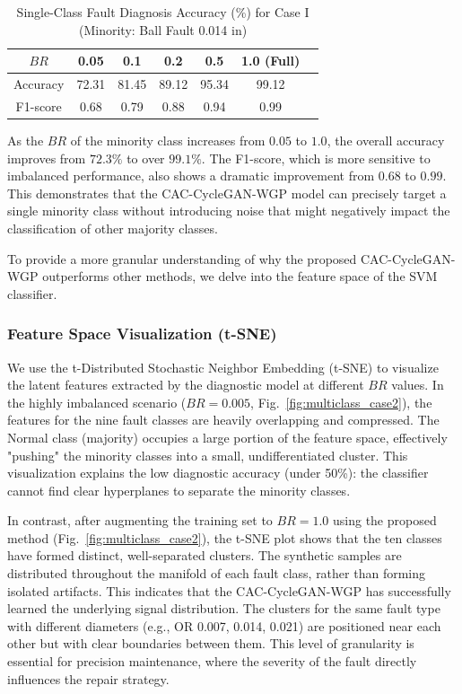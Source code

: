 \begin{table}[htbp]
\centering
\caption{Single-Class Fault Diagnosis Accuracy (\%) for Case I (Minority: Ball Fault 0.014 in)}
\label{tab:single_case1}
\begin{tabular}{ccccccc}
\hline
$BR$ & 0.05 & 0.1 & 0.2 & 0.5 & 1.0 (Full) \\ \hline
Accuracy & 72.31 & 81.45 & 89.12 & 95.34 & 99.12 \\
F1-score & 0.68  & 0.79  & 0.88  & 0.94  & 0.99 \\
\hline
\end{tabular}
\end{table}

As the $BR$ of the minority class increases from $0.05$ to $1.0$, the overall accuracy improves from $72.3\%$ to over $99.1\%$. The F1-score, which is more sensitive to imbalanced performance, also shows a dramatic improvement from $0.68$ to $0.99$. This demonstrates that the CAC-CycleGAN-WGP model can precisely target a single minority class without introducing noise that might negatively impact the classification of other majority classes.

To provide a more granular understanding of why the proposed CAC-CycleGAN-WGP outperforms other methods, we delve into the feature space of the SVM classifier.

\subsubsection{Feature Space Visualization (t-SNE)}
We use the t-Distributed Stochastic Neighbor Embedding (t-SNE) to visualize the latent features extracted by the diagnostic model at different $BR$ values. In the highly imbalanced scenario ($BR=0.005$, Fig.~\ref{fig:multiclass_case2}), the features for the nine fault classes are heavily overlapping and compressed. The Normal class (majority) occupies a large portion of the feature space, effectively "pushing" the minority classes into a small, undifferentiated cluster. This visualization explains the low diagnostic accuracy (under 50\%): the classifier cannot find clear hyperplanes to separate the minority classes.

In contrast, after augmenting the training set to $BR=1.0$ using the proposed method (Fig.~\ref{fig:multiclass_case2}), the t-SNE plot shows that the ten classes have formed distinct, well-separated clusters. The synthetic samples are distributed throughout the manifold of each fault class, rather than forming isolated artifacts. This indicates that the CAC-CycleGAN-WGP has successfully learned the underlying signal distribution. The clusters for the same fault type with different diameters (e.g., OR 0.007, 0.014, 0.021) are positioned near each other but with clear boundaries between them. This level of granularity is essential for precision maintenance, where the severity of the fault directly influences the repair strategy.

